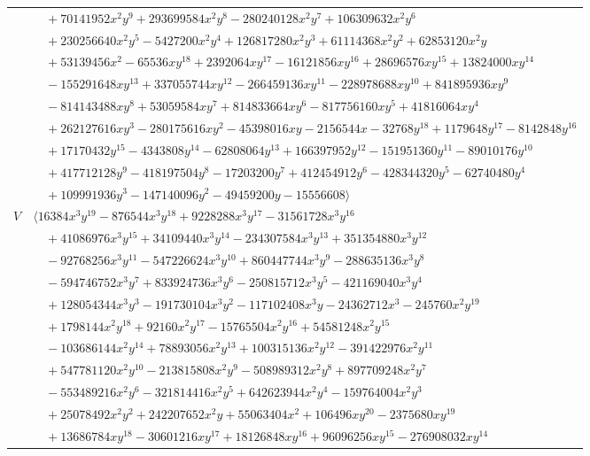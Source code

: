 \documentclass[11pt]{article}
\begin{document}
\begin{longtable}{@{}ll@{}}
 & $\quad +70141952x^{2}y^{9}+293699584x^{2}y^{8}-280240128x^{2}y^{7}+106309632x^{2}y^{6}$\\
 & $\quad +230256640x^{2}y^{5}-5427200x^{2}y^{4}+126817280x^{2}y^{3}+61114368x^{2}y^{2}+62853120x^{2}y$\\
 & $\quad +53139456x^{2}-65536xy^{18}+2392064xy^{17}-16121856xy^{16}+28696576xy^{15}+13824000xy^{14}$\\
 & $\quad -155291648xy^{13}+337055744xy^{12}-266459136xy^{11}-228978688xy^{10}+841895936xy^{9}$\\
 & $\quad -814143488xy^{8}+53059584xy^{7}+814833664xy^{6}-817756160xy^{5}+41816064xy^{4}$\\
 & $\quad +262127616xy^{3}-280175616xy^{2}-45398016xy-2156544x-32768y^{18}+1179648y^{17}-8142848y^{16}$\\
 & $\quad +17170432y^{15}-4343808y^{14}-62808064y^{13}+166397952y^{12}-151951360y^{11}-89010176y^{10}$\\
 & $\quad +417712128y^{9}-418197504y^{8}-17203200y^{7}+412454912y^{6}-428344320y^{5}-62740480y^{4}$\\
 & $\quad +109991936y^{3}-147140096y^{2}-49459200y-15556608\rangle$\\
$V$ & $\langle 16384x^{3}y^{19}-876544x^{3}y^{18}+9228288x^{3}y^{17}-31561728x^{3}y^{16}$\\
 & $\quad +41086976x^{3}y^{15}+34109440x^{3}y^{14}-234307584x^{3}y^{13}+351354880x^{3}y^{12}$\\
 & $\quad -92768256x^{3}y^{11}-547226624x^{3}y^{10}+860447744x^{3}y^{9}-288635136x^{3}y^{8}$\\
 & $\quad -594746752x^{3}y^{7}+833924736x^{3}y^{6}-250815712x^{3}y^{5}-421169040x^{3}y^{4}$\\
 & $\quad +128054344x^{3}y^{3}-191730104x^{3}y^{2}-117102408x^{3}y-24362712x^{3}-245760x^{2}y^{19}$\\
 & $\quad +1798144x^{2}y^{18}+92160x^{2}y^{17}-15765504x^{2}y^{16}+54581248x^{2}y^{15}$\\
 & $\quad -103686144x^{2}y^{14}+78893056x^{2}y^{13}+100315136x^{2}y^{12}-391422976x^{2}y^{11}$\\
 & $\quad +547781120x^{2}y^{10}-213815808x^{2}y^{9}-508989312x^{2}y^{8}+897709248x^{2}y^{7}$\\
 & $\quad -553489216x^{2}y^{6}-321814416x^{2}y^{5}+642623944x^{2}y^{4}-159764004x^{2}y^{3}$\\
 & $\quad +25078492x^{2}y^{2}+242207652x^{2}y+55063404x^{2}+106496xy^{20}-2375680xy^{19}$\\
 & $\quad +13686784xy^{18}-30601216xy^{17}+18126848xy^{16}+96096256xy^{15}-276908032xy^{14}$\\

\end{longtable}
\end{document}
